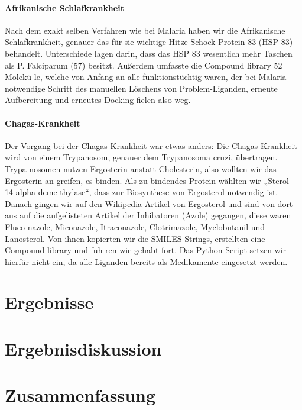 \documentclass[10pt]{article}
\begin{document}
{    \paragraph{Afrikanische Schlafkrankheit}
    Nach dem exakt selben Verfahren wie bei Malaria haben wir die Afrikanische Schlafkrankheit, genauer das für sie wichtige Hitze-Schock Protein 83 (HSP 83) behandelt. Unterschiede lagen darin, dass das HSP 83 wesentlich mehr Taschen als P. Falciparum (57) besitzt. Außerdem umfasste die Compound library 52 Molekü-le, welche von Anfang an alle funktionstüchtig waren, der bei Malaria notwendige Schritt des manuellen Löschens von Problem-Liganden, erneute Aufbereitung und erneutes Docking fielen also weg.

    \paragraph{Chagas-Krankheit}
    Der Vorgang bei der Chagas-Krankheit war etwas anders: Die Chagas-Krankheit wird von einem Trypanosom, genauer dem Trypanosoma cruzi, übertragen. Trypa-nosomen nutzen Ergosterin anstatt Cholesterin, also wollten wir das Ergosterin an-greifen, es binden. Als zu bindendes Protein wählten wir „Sterol 14-alpha deme-thylase“, dass zur Biosynthese von Ergosterol notwendig ist.
    Danach gingen wir auf den Wikipedia-Artikel von Ergosterol und sind von dort aus auf die aufgelisteten Artikel der Inhibatoren (Azole) gegangen, diese waren Fluco-nazole, Miconazole, Itraconazole, Clotrimazole, Myclobutanil und Lanosterol. Von ihnen kopierten wir die SMILES-Strings, erstellten eine Compound library und fuh-ren wie gehabt fort. Das Python-Script setzen wir hierfür nicht ein, da alle Liganden bereits als Medikamente eingesetzt werden.


    \section{Ergebnisse}\label{sec:ergebnisse}



    \section{Ergebnisdiskussion}\label{sec:ergebnisdiskussion}



    \section{Zusammenfassung}\label{sec:zusammenfassung}

}
\end{document}
